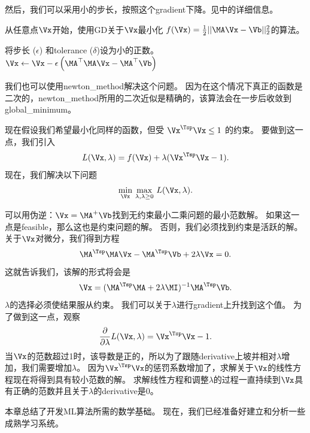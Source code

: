 然后，我们可以采用小的步长，按照这个\gls{gradient}下降。见中的详细信息。

\begin{algorithm}[ht]
\caption{从任意点$\Vx$开始，使用\gls{GD}关于$\Vx$最小化
$ f(\Vx) = \frac{1}{2} || \MA \Vx - \Vb ||_2^2$的算法。
}
\label{alg:gdlsq}
\begin{algorithmic}
\STATE 将步长 ($\epsilon$) 和\gls{tolerance} ($\delta$)设为小的正数。
\STATE $\Vx \leftarrow \Vx - \epsilon \left( \MA^\top \MA \Vx - \MA^\top \Vb \right)$
\ENDWHILE
\end{algorithmic}
\end{algorithm}


我们也可以使用\gls{newton_method}解决这个问题。
因为在这个情况下真正的函数是二次的，\gls{newton_method}所用的二次近似是精确的，该算法会在一步后收敛到\gls{global_minimum}。

现在假设我们希望最小化同样的函数，但受 $\Vx^\Tsp \Vx \leq 1$ 的约束。 
要做到这一点，我们引入
\begin{align}
 L(\Vx, \lambda) = f(\Vx) + \lambda (\Vx^\Tsp \Vx - 1).
\end{align}
现在，我们解决以下问题
\begin{align}
  \underset{\Vx}{\min}~
 \underset{\lambda, \lambda \geq 0}{\max}~ L(\Vx, \lambda) .
\end{align}


可以用伪逆：$\Vx = \MA^+ \Vb$找到无约束最小二乘问题的最小范数解。
如果这一点是\gls{feasible}，那么这也是约束问题的解。
否则，我们必须找到约束是活跃的解。
关于$\Vx$对微分，我们得到方程
\begin{align}
 \MA^\Tsp \MA \Vx - \MA^\Tsp \Vb + 2 \lambda \Vx = 0.
\end{align}
这就告诉我们，该解的形式将会是
\begin{align}
\Vx =  (\MA^\Tsp \MA + 2 \lambda \MI )^{-1} \MA^\Tsp \Vb.
\end{align}
$\lambda$的选择必须使结果服从约束。
我们可以关于$\lambda$进行\gls{gradient}上升找到这个值。
为了做到这一点，观察
\begin{align}
 \frac{\partial}{\partial \lambda} L(\Vx, \lambda)  = \Vx^\Tsp \Vx - 1.
\end{align}
当$\Vx$的范数超过1时，该导数是正的，所以为了跟随\gls{derivative}上坡并相对$\lambda$增加，我们需要增加$\lambda$。
因为$\Vx^\Tsp \Vx$的惩罚系数增加了，求解关于$\Vx$的线性方程现在将得到具有较小范数的解。
求解线性方程和调整$\lambda$的过程一直持续到$\Vx$具有正确的范数并且关于$\lambda$的\gls{derivative}是$0$。

本章总结了开发\gls{ML}算法所需的数学基础。
现在，我们已经准备好建立和分析一些成熟学习系统。


